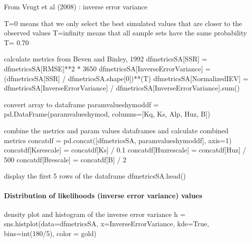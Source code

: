 \documentclass[letterpaper,10pt,english]{book}
\begin{document}
\begin{sphinxVerbatim}[commandchars=\\\{\}]
\PYGZsh{} From Vrugt et al (2008) : inverse error variance

\PYGZsh{} T=0 means that we only select the best simulated values that are closer to the observed values
\PYGZsh{}  T=infinity means that all sample sets have the same probability
T= 0.70

\PYGZsh{} calculate metrics from Beven and Binley, 1992
df\PYGZus{}metrics\PYGZus{}SA[\PYGZdq{}SSR\PYGZdq{}] = df\PYGZus{}metrics\PYGZus{}SA[\PYGZdq{}RMSE\PYGZdq{}]**2 * 3650
df\PYGZus{}metrics\PYGZus{}SA[\PYGZdq{}InverseErrorVariance\PYGZdq{}] = (df\PYGZus{}metrics\PYGZus{}SA[\PYGZdq{}SSR\PYGZdq{}] / df\PYGZus{}metrics\PYGZus{}SA.shape[0])**(\PYGZhy{}T)
df\PYGZus{}metrics\PYGZus{}SA[\PYGZdq{}Normalized\PYGZus{}IEV\PYGZdq{}] = df\PYGZus{}metrics\PYGZus{}SA[\PYGZdq{}InverseErrorVariance\PYGZdq{}] / df\PYGZus{}metrics\PYGZus{}SA[\PYGZdq{}InverseErrorVariance\PYGZdq{}].sum()

\PYGZsh{} convert array to dataframe
param\PYGZus{}values\PYGZus{}hymod\PYGZus{}df = pd.DataFrame(param\PYGZus{}values\PYGZus{}hymod, columns=[\PYGZsq{}Kq\PYGZsq{}, \PYGZsq{}Ks\PYGZsq{}, \PYGZsq{}Alp\PYGZsq{}, \PYGZsq{}Huz\PYGZsq{}, \PYGZsq{}B\PYGZsq{}])

\PYGZsh{} combine the metrics and param values dataframes and calculate combined metrics
concat\PYGZus{}df = pd.concat([df\PYGZus{}metrics\PYGZus{}SA, param\PYGZus{}values\PYGZus{}hymod\PYGZus{}df], axis=1)
concat\PYGZus{}df[\PYGZdq{}Ks\PYGZus{}rescale\PYGZdq{}] = concat\PYGZus{}df[\PYGZdq{}Ks\PYGZdq{}] / 0.1
concat\PYGZus{}df[\PYGZdq{}Huz\PYGZus{}rescale\PYGZdq{}] = concat\PYGZus{}df[\PYGZdq{}Huz\PYGZdq{}] / 500
concat\PYGZus{}df[\PYGZdq{}B\PYGZus{}rescale\PYGZdq{}] = concat\PYGZus{}df[\PYGZdq{}B\PYGZdq{}] / 2

\PYGZsh{} display the first 5 rows of the dataframe
df\PYGZus{}metrics\PYGZus{}SA.head()
\end{sphinxVerbatim}




\paragraph{Distribution of likelihoods (inverse error variance) values}
\label{\detokenize{A2_Jupyter_Notebooks:distribution-of-likelihoods-inverse-error-variance-values}}
\begin{sphinxVerbatim}[commandchars=\\\{\}]
\PYGZsh{} density plot and histogram of the inverse error variance
h = sns.histplot(data=df\PYGZus{}metrics\PYGZus{}SA,
                 x=\PYGZdq{}InverseErrorVariance\PYGZdq{},
                 kde=True,
                 bins=int(180/5),
                 color = \PYGZsq{}gold\PYGZsq{})
\end{sphinxVerbatim}
\end{document}
